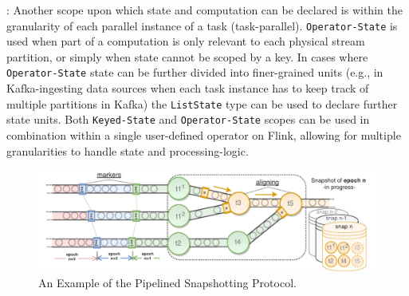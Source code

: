 : Another scope upon which state and computation can be declared is within the granularity of each parallel instance of a task (task-parallel). \texttt{Operator-State} is used when part of a computation is only relevant to each physical stream partition, or simply when state cannot be scoped by a key. In cases where \texttt{Operator-State} state can be further divided into finer-grained units (e.g., in Kafka-ingesting data sources when each task instance has to keep track of multiple partitions in Kafka) the \texttt{ListState} type can be used to declare further state units. Both \texttt{Keyed-State} and \texttt{Operator-State} scopes can be used in combination within a single user-defined operator on Flink, allowing for multiple granularities to handle state and processing-logic.




\begin{figure}[t]
\centering
\includegraphics[width=\textwidth]{figures/snapshots-overview.pdf}
\vspace*{-10mm}
\caption{An Example of the Pipelined Snapshotting Protocol.} 
\label{fig:snapshots-overview}
\vspace{-4mm}
\end{figure}


